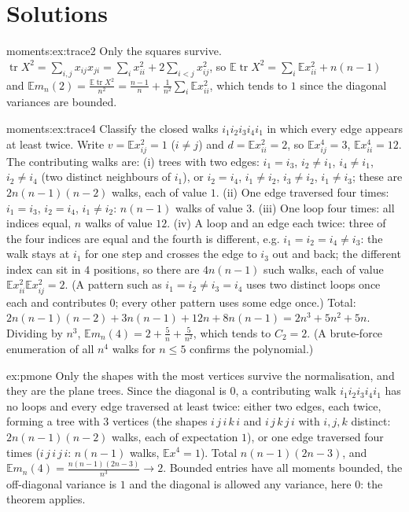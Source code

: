 \section{Solutions}
\begin{solution}{moments:ex:trace2}
\idea Only the squares survive.
\writeup $\operatorname{tr}X^2=\sum_{i,j}x_{ij}x_{ji}=\sum_ix_{ii}^2+2\sum_{i<j}x_{ij}^2$, so $\mathbb E\operatorname{tr}X^2=\sum_i\mathbb Ex_{ii}^2+n(n-1)$ and
$\mathbb Em_n(2)=\frac{\mathbb E\operatorname{tr}X^2}{n^2}=\frac{n-1}n+\frac1{n^2}\sum_i\mathbb Ex_{ii}^2$, which tends to $1$ since the diagonal variances are bounded.
\end{solution}
\begin{solution}{moments:ex:trace4}
\idea Classify the closed walks $i_1i_2i_3i_4i_1$ in which every edge appears at least twice.
\writeup Write $v=\mathbb E x_{ij}^2=1$ ($i\ne j$) and $d=\mathbb Ex_{ii}^2=2$, so $\mathbb Ex_{ij}^4=3$, $\mathbb Ex_{ii}^4=12$. The contributing walks are:
(i) trees with two edges: $i_1=i_3$, $i_2\ne i_1$, $i_4\ne i_1$, $i_2\ne i_4$ (two distinct neighbours of $i_1$), or $i_2=i_4$, $i_1\ne i_2$, $i_3\ne i_2$, $i_1\ne i_3$;
these are $2n(n-1)(n-2)$ walks, each of value $1$. (ii) One edge traversed four times: $i_1=i_3$, $i_2=i_4$, $i_1\ne i_2$: $n(n-1)$ walks of value $3$.
(iii) One loop four times: all indices equal, $n$ walks of value $12$. (iv) A loop and an edge each twice: three of the four indices are equal and the fourth is different, e.g. $i_1=i_2=i_4\ne i_3$: the walk stays at
$i_1$ for one step and crosses the edge to $i_3$ out and back; the different index can sit in $4$ positions, so there are $4n(n-1)$ such walks, each of
value $\mathbb Ex_{ii}^2\mathbb Ex_{ij}^2=2$. (A pattern such as $i_1=i_2\ne i_3=i_4$ uses two distinct loops once each and contributes $0$; every other
pattern uses some edge once.) Total:
$2n(n-1)(n-2)+3n(n-1)+12n+8n(n-1)=2n^3+5n^2+5n$. Dividing by $n^3$, $\mathbb Em_n(4)=2+\frac5n+\frac5{n^2}$, which tends to $C_2=2$.
(A brute-force enumeration of all $n^4$ walks for $n\le5$ confirms the polynomial.)
\end{solution}

\begin{solution}{ex:pmone}
\idea Only the shapes with the most vertices survive the normalisation, and they are the plane trees.
\writeup Since the diagonal is $0$, a contributing walk $i_1i_2i_3i_4i_1$ has no loops and every edge traversed at least twice: either two edges, each twice, forming a tree with $3$ vertices (the shapes $i\,j\,i\,k\,i$ and $i\,j\,k\,j\,i$
with $i,j,k$ distinct: $2n(n-1)(n-2)$ walks, each of expectation $1$), or one edge traversed four times ($i\,j\,i\,j\,i$: $n(n-1)$ walks, $\mathbb Ex^4=1$). Total $n(n-1)(2n-3)$, and $\mathbb Em_n(4)=\frac{n(n-1)(2n-3)}{n^3}\to2$.
Bounded entries have all moments bounded, the off-diagonal variance is $1$ and the diagonal is allowed any variance, here $0$: the theorem applies.
\end{solution}

